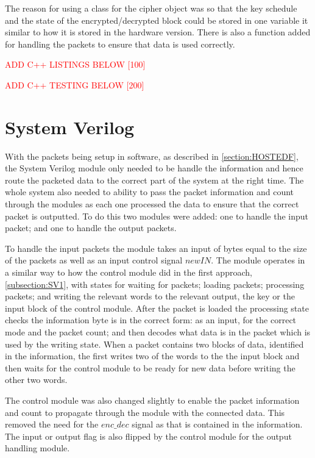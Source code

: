 \documentclass[12pt,twoside,a4paper]{report}
\begin{document}
   	The reason for using a class for the cipher object was so that the key schedule and the state of the encrypted/decrypted block could be stored in one variable it similar to how it is stored in the hardware version. There is also a function added for handling the packets to ensure that data is used correctly.
   	
   	\textcolor{red}{ADD C++ LISTINGS BELOW [100]} 
    
	\textcolor{red}{ADD C++ TESTING BELOW [200]} 
    
	\section{System Verilog}
	\label{section:SVF}
		
	With the packets being setup in software, as described in \autoref{section:HOSTEDF}, the System Verilog module only needed to be handle the information and hence route the packeted data to the correct part of the system at the right time. The whole system also needed to ability to pass the packet information and count through the modules as each one processed the data to ensure that the correct packet is outputted. To do this two modules were added: one to handle the input packet; and one to handle the output packets.
	
	To handle the input packets the module takes an input of bytes equal to the size of the packets as well as an input control signal $newIN$. The module operates in a similar way to how the control module did in the first approach, \autoref{subsection:SV1}, with states for waiting for packets; loading packets; processing packets; and writing the relevant words to the relevant output, the key or the input block of the control module. After the packet is loaded the processing state checks the information byte is in the correct form: as an input, for the correct mode and the packet count; and then decodes what data is in the packet which is used by the writing state. When a packet contains two blocks of data, identified in the information, the first writes two of the words to the the input block and then waits for the control module to be ready for new data before writing the other two words.
	
	The control module was also changed slightly to enable the packet information and count to propagate through the module with the connected data. This removed the need for the $enc\_dec$ signal as that is contained in the information. The input or output flag is also flipped by the control module for the output handling module.
	
\end{document}
